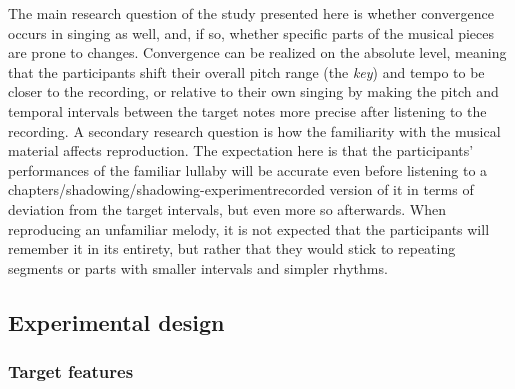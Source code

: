 The main research question of the study presented here is whether convergence occurs in singing as well, and, if so, whether specific parts of the musical pieces are prone to changes.
Convergence can be realized on the absolute level, meaning that the participants shift their overall pitch range (the \emph{key}) and tempo to be closer to the recording, or relative to their own singing by making the pitch and temporal intervals between the target notes more precise after listening to the recording.
A secondary research question is how the familiarity with the musical material affects reproduction.
The expectation here is that the participants' performances of the familiar lullaby will be accurate even before listening to a chapters/shadowing/shadowing-experimentrecorded version of it in terms of deviation from the target intervals, but even more so afterwards.
When reproducing an unfamiliar melody, it is not expected that the participants will remember it in its entirety, but rather that they would stick to repeating segments or parts with smaller intervals and simpler rhythms.


\subsection{Experimental design}
\label{subsec:design_music}

\subsubsection{Target features}
\label{subsubsec:target_features_music}

